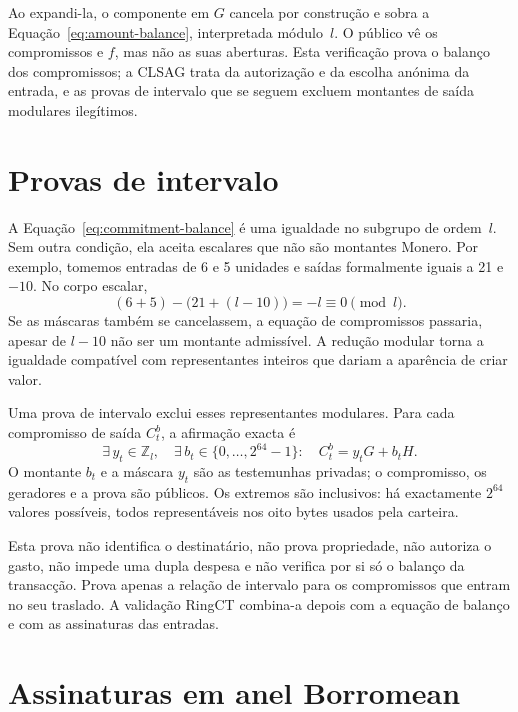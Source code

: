 Ao expandi-la, o componente em \(G\) cancela por construção e sobra a
Equação~\eqref{eq:amount-balance}, interpretada módulo~\(l\). O público vê os
compromissos e \(f\), mas não as suas aberturas. Esta verificação prova o
balanço dos compromissos; a CLSAG trata da autorização e da escolha anónima da
entrada, e as provas de intervalo que se seguem excluem montantes de saída
modulares ilegítimos.

\section{Provas de intervalo}
\label{sec:range_proofs}

A Equação~\eqref{eq:commitment-balance} é uma igualdade no subgrupo de
ordem~\(l\). Sem outra condição, ela aceita escalares que não são montantes
Monero. Por exemplo, tomemos entradas de 6 e 5 unidades e saídas formalmente
iguais a 21 e \(-10\). No corpo escalar,
\[
 (6+5)-\bigl(21+(l-10)\bigr)=-l\equiv0\pmod l.
\]
Se as máscaras também se cancelassem, a equação de compromissos passaria,
apesar de \(l-10\) não ser um montante admissível. A redução modular torna
a igualdade compatível com representantes inteiros que dariam a aparência
de criar valor.

Uma prova de intervalo exclui esses representantes modulares. Para cada compromisso de saída
\(C_t^b\), a afirmação exacta é
\begin{equation}
 \exists\,y_t\in\mathbb Z_l,\quad
 \exists\,b_t\in\{0,\ldots,2^{64}-1\}:
 \quad C_t^b=y_tG+b_tH.
 \label{eq:range-statement}
\end{equation}
O montante \(b_t\) e a máscara \(y_t\) são as testemunhas privadas; o
compromisso, os geradores e a prova são públicos. Os extremos são inclusivos:
há exactamente \(2^{64}\) valores possíveis, todos representáveis nos oito
bytes usados pela carteira.

Esta prova não identifica o destinatário, não prova propriedade, não autoriza
o gasto, não impede uma dupla despesa e não verifica por si só o balanço da
transacção. Prova apenas a relação de intervalo para os compromissos que entram
no seu traslado. A validação RingCT combina-a depois com a equação de balanço e
com as assinaturas das entradas.

\section{Assinaturas em anel Borromean}
\label{sec:borromean}


